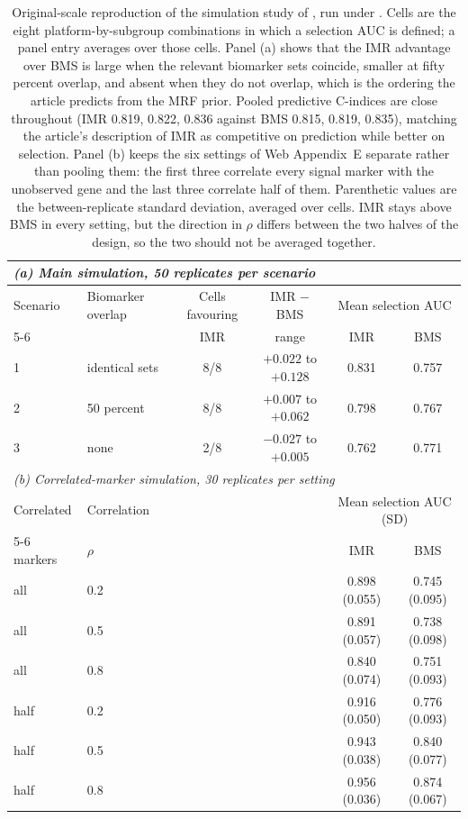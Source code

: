 \begin{table}[!ht]
\centering
\begin{tabular}{l l c c c c}
\toprule
\multicolumn{6}{l}{\textit{(a) Main simulation, 50 replicates per scenario}} \\
\midrule
Scenario & Biomarker overlap & Cells favouring & IMR $-$ BMS &
\multicolumn{2}{c}{Mean selection AUC} \\
\cmidrule(lr){5-6}
 & & IMR & range & IMR & BMS \\
\midrule
1 & identical sets   & 8/8 & $+0.022$ to $+0.128$ & 0.831 & 0.757 \\
2 & 50 percent       & 8/8 & $+0.007$ to $+0.062$ & 0.798 & 0.767 \\
3 & none             & 2/8 & $-0.027$ to $+0.005$ & 0.762 & 0.771 \\
\midrule
\multicolumn{6}{l}{\textit{(b) Correlated-marker simulation, 30 replicates per setting}} \\
\midrule
Correlated & Correlation & \multicolumn{2}{c}{} &
\multicolumn{2}{c}{Mean selection AUC (SD)} \\
\cmidrule(lr){5-6}
markers & $\rho$ & & & IMR & BMS \\
\midrule
all  & 0.2 & & & 0.898 (0.055) & 0.745 (0.095) \\
all  & 0.5 & & & 0.891 (0.057) & 0.738 (0.098) \\
all  & 0.8 & & & 0.840 (0.074) & 0.751 (0.093) \\
half & 0.2 & & & 0.916 (0.050) & 0.776 (0.093) \\
half & 0.5 & & & 0.943 (0.038) & 0.840 (0.077) \\
half & 0.8 & & & 0.956 (0.036) & 0.874 (0.067) \\
\bottomrule
\end{tabular}
\caption{\label{tab:simulation-reproduction}Original-scale reproduction of the
simulation study of \citet[Section~5.2 and Web Appendix~E]{chekouo2017}, run
under . Cells are the eight platform-by-subgroup
combinations in which a selection AUC is defined; a panel entry averages over
those cells. Panel (a) shows that the IMR advantage over BMS is large when the
relevant biomarker sets coincide, smaller at fifty percent overlap, and absent
when they do not overlap, which is the ordering the article predicts from the
MRF prior. Pooled predictive C-indices are close throughout (IMR 0.819, 0.822,
0.836 against BMS 0.815, 0.819, 0.835), matching the article's description of
IMR as competitive on prediction while better on selection. Panel (b) keeps the
six settings of Web Appendix~E separate rather than pooling them: the first
three correlate every signal marker with the unobserved gene and the last three
correlate half of them. Parenthetic values are the between-replicate standard
deviation, averaged over cells. IMR stays above BMS in every setting, but the
direction in $\rho$ differs between the two halves of the design, so the two
should not be averaged together.}
\end{table}
